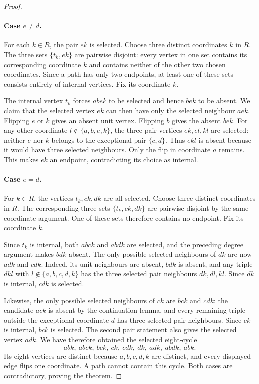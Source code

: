 \documentclass[11pt,a4paper]{article}
\theoremstyle{definition}
\theoremstyle{remark}
\begin{document}
\begin{proof}
\paragraph{Case $e\ne d$.}
For each $k\in R$, the pair $ek$ is selected. Choose three distinct coordinates $k$ in $R$. The three sets $\{t_k,ek\}$ are pairwise disjoint: every vertex in one set contains its corresponding coordinate $k$ and contains neither of the other two chosen coordinates. Since a path has only two endpoints, at least one of these sets consists entirely of internal vertices. Fix its coordinate $k$.

The internal vertex $t_k$ forces $abek$ to be selected and hence $bek$ to be absent. We claim that the selected vertex $ek$ can then have only the selected neighbour $aek$. Flipping $e$ or $k$ gives an absent unit vertex. Flipping $b$ gives the absent $bek$. For any other coordinate $l\notin\{a,b,e,k\}$, the three pair vertices $ek,el,kl$ are selected: neither $e$ nor $k$ belongs to the exceptional pair $\{c,d\}$. Thus $ekl$ is absent because it would have three selected neighbours. Only the flip in coordinate $a$ remains. This makes $ek$ an endpoint, contradicting its choice as internal.

\paragraph{Case $e=d$.}
For $k\in R$, the vertices $t_k,ck,dk$ are all selected. Choose three distinct coordinates in $R$. The corresponding three sets $\{t_k,ck,dk\}$ are pairwise disjoint by the same coordinate argument. One of these sets therefore contains no endpoint. Fix its coordinate $k$.

Since $t_k$ is internal, both $abck$ and $abdk$ are selected, and the preceding degree argument makes $bdk$ absent. The only possible selected neighbours of $dk$ are now $adk$ and $cdk$. Indeed, its unit neighbours are absent, $bdk$ is absent, and any triple $dkl$ with $l\notin\{a,b,c,d,k\}$ has the three selected pair neighbours $dk,dl,kl$. Since $dk$ is internal, $cdk$ is selected.

Likewise, the only possible selected neighbours of $ck$ are $bck$ and $cdk$: the candidate $ack$ is absent by the continuation lemma, and every remaining triple outside the exceptional coordinate $d$ has three selected pair neighbours. Since $ck$ is internal, $bck$ is selected. The second pair statement also gives the selected vertex $adk$. We have therefore obtained the selected eight-cycle
\[
abk,\ abck,\ bck,\ ck,\ cdk,\ dk,\ adk,\ abdk,\ abk.
\]
Its eight vertices are distinct because $a,b,c,d,k$ are distinct, and every displayed edge flips one coordinate. A path cannot contain this cycle. Both cases are contradictory, proving the theorem.
\end{proof}
\end{document}
